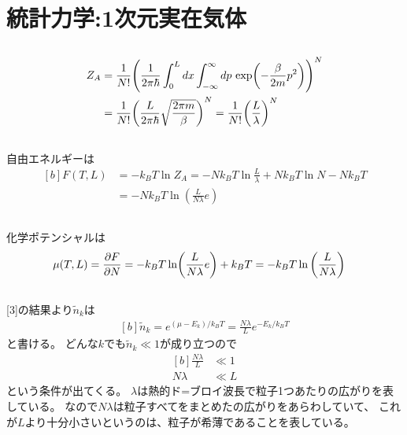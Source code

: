 \documentclass[../ap_2012.tex]{subfiles}
\begin{document}
\setcounter{chapter}{1}
\chapter{統計力学:1次元実在気体}
\section{}
\begin{equation}\begin{aligned}[b]
    Z_A &= \frac{1}{N!}\qty(\frac{1}{2\pi\hbar}\int_{0}^{L}dx\int_{-\infty}^{\infty}dp\,\exp(-\frac{\beta}{2m}p^2))^N\\
    &=\frac{1}{N!}\qty(\frac{L}{2\pi\hbar}\sqrt{\frac{2\pi m}{\beta}})^N = \frac{1}{N!}\qty(\frac{L}{\lambda})^N
\end{aligned}\end{equation}

\section{}
自由エネルギーは
\begin{equation}\begin{aligned}[b]
    F(T,L) &= -k_BT\ln Z_A = -Nk_BT\ln\frac{L}{\lambda}+Nk_BT\ln N -Nk_BT\\
    &= -Nk_BT\ln(\frac{L}{N\lambda}e)
\end{aligned}\end{equation}

\section{}
化学ポテンシャルは
\begin{equation}\begin{aligned}[b]
    \mu(T,L) &= \pdv{F}{N}=-k_BT\ln(\frac{L}{N\lambda}e)+k_BT=-k_BT\ln\qty(\frac{L}{N\lambda})
\end{aligned}\end{equation}

\section{}
[3]の結果より\(\tilde{n}_k\)は
\begin{equation}\begin{aligned}[b]
    \tilde{n}_k =e^{(\mu-E_k)/k_BT} = \frac{N\lambda}{L}e^{-E_k/k_BT}
\end{aligned}\end{equation}
と書ける。
どんな\(k\)でも\(\tilde{n}_k\ll1\)が成り立つので
\begin{equation}\begin{aligned}[b]
    \frac{N\lambda}{L}&\ll 1 \\
    N\lambda &\ll L
\end{aligned}\end{equation}
という条件が出てくる。
\(\lambda\)は熱的ド=ブロイ波長で粒子1つあたりの広がりを表している。
なので\(N\lambda\)は粒子すべてをまとめたの広がりをあらわしていて、
これが\(L\)より十分小さいというのは、粒子が希薄であることを表している。
\end{document}
